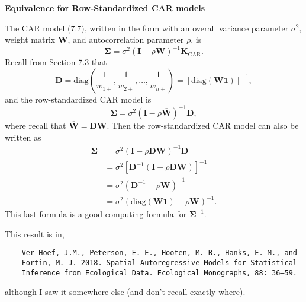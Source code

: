\documentclass[12pt, titlepage]{article}
\begin{document}
\setcounter{equation}{0}
\renewcommand{\theequation}{R.\arabic{equation}}


%
%

{\large \flushleft \textbf{Equivalence for Row-Standardized CAR models}}

\vspace{.3cm}

The CAR model (7.7), written in the form with an overall variance parameter $\sigma^{2}$, weight matrix $\mathbf{W}$, and autocorrelation parameter $\rho$,  is
$$
\boldsymbol{\Sigma} = \sigma^{2}(\mathbf{I} - \rho\mathbf{W})^{-1}\mathbf{K}_{\textrm{CAR}}.
$$
Recall from Section 7.3 that
$$
\mathbf{D} = \textrm{diag}\left(\frac{1}{w_{1+}}, \frac{1}{w_{2+}}, \ldots, \frac{1}{w_{n+}}  \right) = [\textrm{diag}(\mathbf{W}\mathbf{1})]^{-1},
$$
and the row-standardized CAR model is
$$
\boldsymbol{\Sigma} = \sigma^{2}(\mathbf{I} - \rho\overline{\mathbf{W}})^{-1}\mathbf{D},
$$
where recall that $\overline{\mathbf{W}} = \mathbf{D}\mathbf{W}$. Then the row-standardized CAR model can also be written as
\begin{align*}
	\boldsymbol{\Sigma} &= \sigma^{2}(\mathbf{I} - \rho\mathbf{D}\mathbf{W})^{-1}\mathbf{D} \\
	 &= \sigma^{2}[\mathbf{D}^{-1}(\mathbf{I} - \rho\mathbf{D}\mathbf{W})]^{-1} \\
	 &= \sigma^{2}(\mathbf{D}^{-1} - \rho\mathbf{W})^{-1} \\
	 &= \sigma^{2}(\textrm{diag}(\mathbf{W}\mathbf{1}) - \rho\mathbf{W})^{-1}. 
\end{align*}
This last formula is a good computing formula for $\boldsymbol{\Sigma}^{-1}$.

This result is in,
\begin{verbatim}
	Ver Hoef, J.M., Peterson, E. E., Hooten, M. B., Hanks, E. M., and 
	Fortin, M.-J. 2018. Spatial Autoregressive Models for Statistical 
	Inference from Ecological Data. Ecological Monographs, 88: 36–59.
\end{verbatim}
although I saw it somewhere else (and don't recall exactly where).


%


%
%
\end{document}
